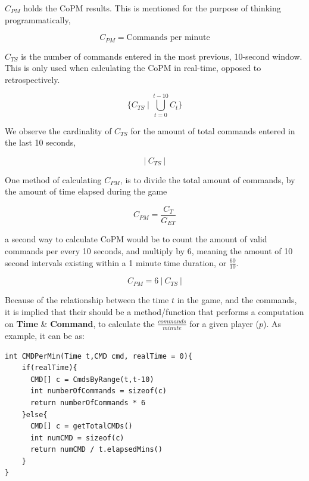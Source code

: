 \documentclass[10pt, titlepage, twocolumn]{article}
\begin{document}
\(C_{PM}\) holds the CoPM results. This is mentioned for the purpose of thinking programmatically,

\begin{equation} 
\label{eq:cmd_per_min}
	C_{PM} = \text{Commands per minute}
\end{equation}

\(C_{TS}\) is the number of commands entered in the most previous, 10-second window. This is only used when calculating the CoPM in real-time, opposed to retrospectively.

\label{eq:cmd_tensecond}
	\begin{equation} 
\label{eq:totalcommandset}
	\{C_{TS} \mid \bigcup \limits_{ t=0 }^{ t-10 } C_{t} \}   
\end{equation}

We observe the cardinality of \(C_{TS}\) for the amount of total commands entered in the last 10 seconds,

\begin{equation}
\label{eq:tenseccard}
	|\ C_{TS}\ |
\end{equation}


One method of calculating \(C_{PM}\), is to divide the total amount of commands, by the amount of time elapsed during the game

\begin{equation} 
\label{eq:cmd_time}
	C_{PM} = \frac{ C_{T} } { G_{ET} }
\end{equation}

a second way to calculate CoPM would be to count the amount of valid commands per every 10 seconds, and multiply by 6, meaning the amount of 10 second intervals existing within a 1 minute time duration, or \(\frac{60}{10}\).

\begin{equation} 
\label{eq:cmd_time}
	C_{PM} = 6\ |\ C_{TS}\ |
\end{equation}

Because of the relationship between the time \(t\) in the game, and the commands, it is implied that their should be a method/function that performs a computation on \textbf{Time} \& \textbf{Command}, to calculate the \( \frac{commands}{minute} \) for a given player (\(p\)). As example, it can be as:

\begin{verbatim}
int CMDPerMin(Time t,CMD cmd, realTime = 0){
    if(realTime){
      CMD[] c = CmdsByRange(t,t-10) 
      int numberOfCommands = sizeof(c)
      return numberOfCommands * 6
    }else{
      CMD[] c = getTotalCMDs()
      int numCMD = sizeof(c)
      return numCMD / t.elapsedMins()
    }
}
\end{verbatim}
\end{document}

